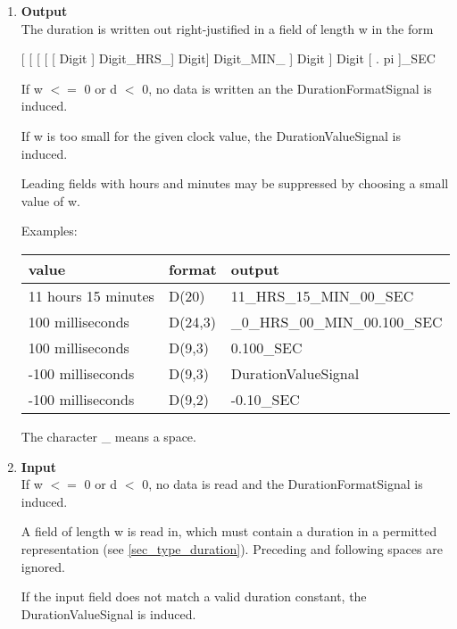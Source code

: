 \begin{enumerate}
\item {\bf Output}\\
The duration is written out right-justified in a field of length w in
the form

[ [ [ [ [ Digit ] Digit\_HRS\_] Digit]  Digit\_MIN\_ ] Digit ] Digit [ . pi ]\_SEC

If w $<=$ 0 or d $<$ 0, no data is written an the DurationFormatSignal
   is induced.

If w is too small for the given clock value, the DurationValueSignal
   is induced.

Leading fields with hours and minutes may be suppressed by 
choosing a small value of w. 

Examples:

\begin{tabular}{lll}
value               & format  & output \\ \hline
11 hours 15 minutes & D(20)   & 11\_HRS\_15\_MIN\_00\_SEC \\
100 milliseconds    & D(24,3) & \_0\_HRS\_00\_MIN\_00.100\_SEC \\
100 milliseconds    & D(9,3) & 0.100\_SEC \\
-100 milliseconds    & D(9,3) & DurationValueSignal \\
-100 milliseconds    & D(9,2) & -0.10\_SEC \\
\end{tabular}

The character \_ means a space.


\item {\bf Input}\\
If w $<=$ 0 or d $<$ 0, no data is read and the DurationFormatSignal
   is induced.

A field of length w is read in, which must contain a duration in a
permitted representation (see \ref{sec_type_duration}).
 Preceding and following spaces are
ignored.

If the input field does not match a valid duration constant, the 
   DurationValueSignal is induced.


\end{enumerate}
